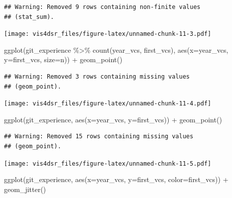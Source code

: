 \documentclass[
]{krantz}
\makeatletter
\newenvironment{Shaded}{\begin{snugshade}}{\end{snugshade}}
\newcommand{\AttributeTok}[1]{\textcolor[rgb]{0.61,0.61,0.61}{#1}}
\newcommand{\FunctionTok}[1]{\textcolor[rgb]{0,0,0}{#1}}
\newcommand{\NormalTok}[1]{#1}
\newcommand{\SpecialCharTok}[1]{\textcolor[rgb]{0,0,0}{#1}}
\newenvironment{kframe}{%
\medskip{}
\setlength{\fboxsep}{.8em}
 \def\at@end@of@kframe{}%
 \ifinner\ifhmode%
  \def\at@end@of@kframe{\end{minipage}}%
  \begin{minipage}{\columnwidth}%
 \fi\fi%
 \def\FrameCommand##1{\hskip\@totalleftmargin \hskip-\fboxsep
 \colorbox{shadecolor}{##1}\hskip-\fboxsep
     \hskip-\linewidth \hskip-\@totalleftmargin \hskip\columnwidth}%
 \MakeFramed {\advance\hsize-\width
   \@totalleftmargin\z@ \linewidth\hsize
   \@setminipage}}%
 {\par\unskip\endMakeFramed%
 \at@end@of@kframe}
\renewenvironment{Shaded}{\begin{kframe}}{\end{kframe}}
\makeatother
\begin{document}
\begin{verbatim}
## Warning: Removed 9 rows containing non-finite values
## (stat_sum).
\end{verbatim}

\texttt{[image: vis4dsr\_files/figure-latex/unnamed-chunk-11-3.pdf]}

\begin{Shaded}
\begin{Highlighting}[]
\FunctionTok{ggplot}\NormalTok{(git\_experience }\SpecialCharTok{\%\textgreater{}\%} \FunctionTok{count}\NormalTok{(year\_vcs, first\_vcs), }
       \FunctionTok{aes}\NormalTok{(}\AttributeTok{x=}\NormalTok{year\_vcs, }\AttributeTok{y=}\NormalTok{first\_vcs, }\AttributeTok{size=}\NormalTok{n)) }\SpecialCharTok{+}
  \FunctionTok{geom\_point}\NormalTok{()}
\end{Highlighting}
\end{Shaded}

\begin{verbatim}
## Warning: Removed 3 rows containing missing values
## (geom_point).
\end{verbatim}

\texttt{[image: vis4dsr\_files/figure-latex/unnamed-chunk-11-4.pdf]}

\begin{Shaded}
\begin{Highlighting}[]
\FunctionTok{ggplot}\NormalTok{(git\_experience, }\FunctionTok{aes}\NormalTok{(}\AttributeTok{x=}\NormalTok{year\_vcs, }\AttributeTok{y=}\NormalTok{first\_vcs)) }\SpecialCharTok{+}
  \FunctionTok{geom\_point}\NormalTok{()}
\end{Highlighting}
\end{Shaded}

\begin{verbatim}
## Warning: Removed 15 rows containing missing values
## (geom_point).
\end{verbatim}

\texttt{[image: vis4dsr\_files/figure-latex/unnamed-chunk-11-5.pdf]}

\begin{Shaded}
\begin{Highlighting}[]
\FunctionTok{ggplot}\NormalTok{(git\_experience, }\FunctionTok{aes}\NormalTok{(}\AttributeTok{x=}\NormalTok{year\_vcs, }\AttributeTok{y=}\NormalTok{first\_vcs, }\AttributeTok{color=}\NormalTok{first\_vcs)) }\SpecialCharTok{+}
  \FunctionTok{geom\_jitter}\NormalTok{()}
\end{Highlighting}
\end{Shaded}
\end{document}
